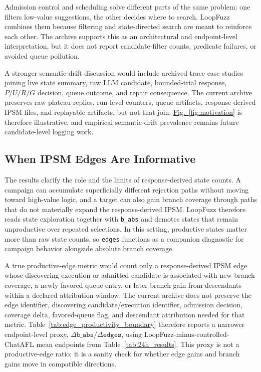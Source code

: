 \documentclass[final,5p,times,number]{elsarticle}
\newcommand{\figref}[1]{\hyperref[#1]{Fig.~\ref*{#1}}}
\begin{document}
Admission control and scheduling solve different parts of the same problem: one filters low-value suggestions, the other decides where to search. LoopFuzz combines them because filtering and state-directed search are meant to reinforce each other. The archive supports this as an architectural and endpoint-level interpretation, but it does not report candidate-filter counts, predicate failures, or avoided queue pollution.

A stronger semantic-drift discussion would include archived trace case studies joining live state summary, raw LLM candidate, bounded-trial response, $P/U/R/G$ decision, queue outcome, and repair consequence. The current archive preserves raw plateau replies, run-level counters, queue artifacts, response-derived IPSM files, and replayable artifacts, but not that join. \figref{fig:motivation} is therefore illustrative, and empirical semantic-drift prevalence remains future candidate-level logging work.

\subsection{When IPSM Edges Are Informative}
\label{sec:ipsm_edges_informative}

The results clarify the role and the limits of response-derived state counts. A campaign can accumulate superficially different rejection paths without moving toward high-value logic, and a target can also gain branch coverage through paths that do not materially expand the response-derived IPSM. LoopFuzz therefore reads state exploration together with \texttt{b\_abs} and demotes states that remain unproductive over repeated selections. In this setting, productive states matter more than raw state counts, so \texttt{edges} functions as a companion diagnostic for campaign behavior alongside absolute branch coverage.

A true productive-edge metric would count only a response-derived IPSM edge whose discovering execution or admitted candidate is associated with new branch coverage, a newly favored queue entry, or later branch gain from descendants within a declared attribution window. The current archive does not preserve the edge identifier, discovering candidate/execution identifier, admission decision, coverage delta, favored-queue flag, and descendant attribution needed for that metric. Table~\ref{tab:edge_productivity_boundary} therefore reports a narrower endpoint-level proxy, $\Delta\texttt{b\_abs}/\Delta\texttt{edges}$, using LoopFuzz-minus-controlled-ChatAFL mean endpoints from Table~\ref{tab:24h_results}. This proxy is not a productive-edge ratio; it is a sanity check for whether edge gains and branch gains move in compatible directions.
\end{document}
